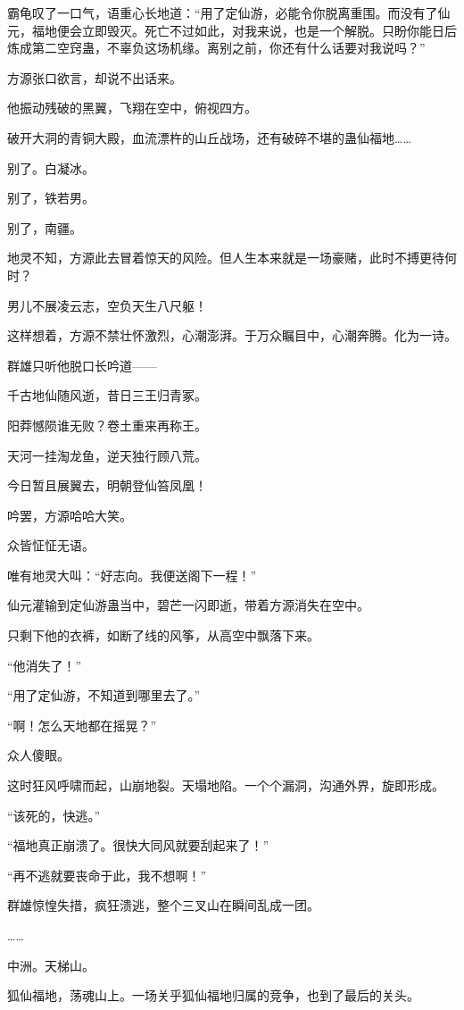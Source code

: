 \begin{this_body}
霸龟叹了一口气，语重心长地道：“用了定仙游，必能令你脱离重围。而没有了仙元，福地便会立即毁灭。死亡不过如此，对我来说，也是一个解脱。只盼你能日后炼成第二空窍蛊，不辜负这场机缘。离别之前，你还有什么话要对我说吗？”

方源张口欲言，却说不出话来。

他振动残破的黑翼，飞翔在空中，俯视四方。

破开大洞的青铜大殿，血流漂杵的山丘战场，还有破碎不堪的蛊仙福地……

别了。白凝冰。

别了，铁若男。

别了，南疆。

地灵不知，方源此去冒着惊天的风险。但人生本来就是一场豪赌，此时不搏更待何时？

男儿不展凌云志，空负天生八尺躯！

这样想着，方源不禁壮怀激烈，心潮澎湃。于万众瞩目中，心潮奔腾。化为一诗。

群雄只听他脱口长吟道——

千古地仙随风逝，昔日三王归青冢。

阳莽憾陨谁无败？卷土重来再称王。

天河一挂淘龙鱼，逆天独行顾八荒。

今日暂且展翼去，明朝登仙笞凤凰！

吟罢，方源哈哈大笑。

众皆怔怔无语。

唯有地灵大叫：“好志向。我便送阁下一程！”

仙元灌输到定仙游蛊当中，碧芒一闪即逝，带着方源消失在空中。

只剩下他的衣裤，如断了线的风筝，从高空中飘落下来。

“他消失了！”

“用了定仙游，不知道到哪里去了。”

“啊！怎么天地都在摇晃？”

众人傻眼。

这时狂风呼啸而起，山崩地裂。天塌地陷。一个个漏洞，沟通外界，旋即形成。

“该死的，快逃。”

“福地真正崩溃了。很快大同风就要刮起来了！”

“再不逃就要丧命于此，我不想啊！”

群雄惊惶失措，疯狂溃逃，整个三叉山在瞬间乱成一团。

……

中洲。天梯山。

狐仙福地，荡魂山上。一场关乎狐仙福地归属的竞争，也到了最后的关头。


\end{this_body}
